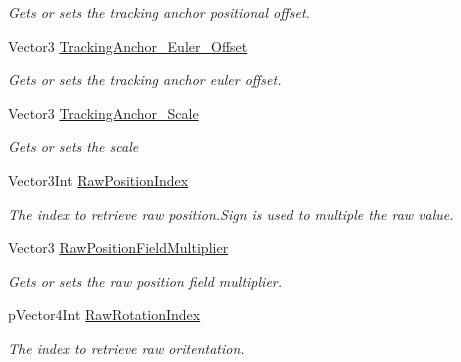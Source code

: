 \begin{DoxyCompactItemize}
\begin{DoxyCompactList}\small\item\em Gets or sets the tracking anchor positional offset. \end{DoxyCompactList}\item 
Vector3 \mbox{\hyperlink{class_ximmerse_1_1_slide_in_s_d_k_1_1_override_a_r_setting_ae091d11cab14b2c913e05775f93b3ded}{Tracking\+Anchor\+\_\+\+Euler\+\_\+\+Offset}}
\begin{DoxyCompactList}\small\item\em Gets or sets the tracking anchor euler offset. \end{DoxyCompactList}\item 
Vector3 \mbox{\hyperlink{class_ximmerse_1_1_slide_in_s_d_k_1_1_override_a_r_setting_a06487302324b68924a2fa728bb36d1b8}{Tracking\+Anchor\+\_\+\+Scale}}
\begin{DoxyCompactList}\small\item\em Gets or sets the scale \end{DoxyCompactList}\item 
Vector3\+Int \mbox{\hyperlink{class_ximmerse_1_1_slide_in_s_d_k_1_1_override_a_r_setting_a15bd172e90167666e752f75b9b171c98}{Raw\+Position\+Index}}
\begin{DoxyCompactList}\small\item\em The index to retrieve raw position.\+Sign is used to multiple the raw value. \end{DoxyCompactList}\item 
Vector3 \mbox{\hyperlink{class_ximmerse_1_1_slide_in_s_d_k_1_1_override_a_r_setting_a2da40af7b2d8dc6efd822c540e326fb4}{Raw\+Position\+Field\+Multiplier}}
\begin{DoxyCompactList}\small\item\em Gets or sets the raw position field multiplier. \end{DoxyCompactList}\item 
p\+Vector4\+Int \mbox{\hyperlink{class_ximmerse_1_1_slide_in_s_d_k_1_1_override_a_r_setting_acf352534b5887ae2408d6c27c8b4153a}{Raw\+Rotation\+Index}}
\begin{DoxyCompactList}\small\item\em The index to retrieve raw oritentation. \end{DoxyCompactList}\item 

\end{DoxyCompactItemize}
